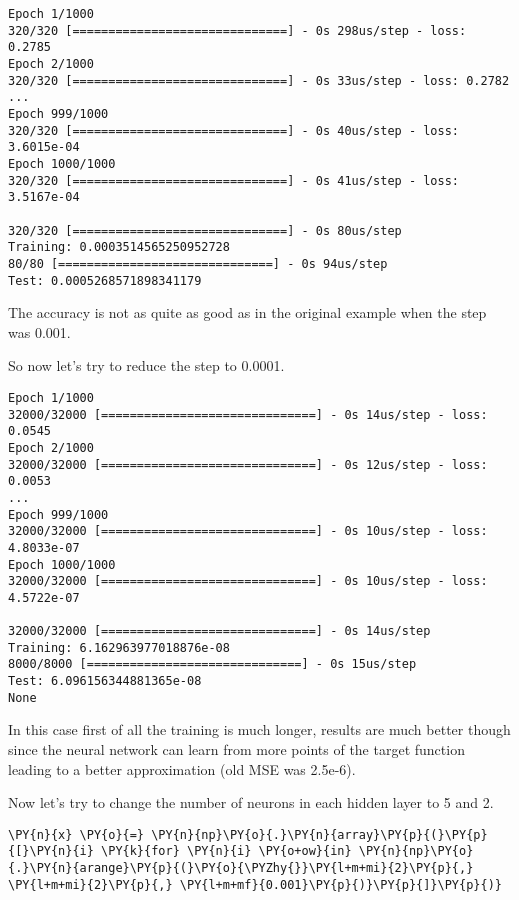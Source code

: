 \begin{Answer}
\begin{tcolorbox}[size=fbox, boxrule=1pt, colback=cellbackground, colframe=cellborder]
\begin{Verbatim}[commandchars=\\\{\}]
Epoch 1/1000
320/320 [==============================] - 0s 298us/step - loss: 0.2785
Epoch 2/1000
320/320 [==============================] - 0s 33us/step - loss: 0.2782
...
Epoch 999/1000
320/320 [==============================] - 0s 40us/step - loss: 3.6015e-04
Epoch 1000/1000
320/320 [==============================] - 0s 41us/step - loss: 3.5167e-04

320/320 [==============================] - 0s 80us/step
Training: 0.0003514565250952728
80/80 [==============================] - 0s 94us/step
Test: 0.0005268571898341179
\end{Verbatim}
\end{tcolorbox}

The accuracy is not as quite as good as in the original example when the step
was 0.001.

So now let's try to reduce the step to 0.0001.
\begin{tcolorbox}[size=fbox, boxrule=1pt, colback=cellbackground, colframe=cellborder]
\begin{Verbatim}[commandchars=\\\{\}]
Epoch 1/1000
32000/32000 [==============================] - 0s 14us/step - loss: 0.0545
Epoch 2/1000
32000/32000 [==============================] - 0s 12us/step - loss: 0.0053
...
Epoch 999/1000
32000/32000 [==============================] - 0s 10us/step - loss: 4.8033e-07
Epoch 1000/1000
32000/32000 [==============================] - 0s 10us/step - loss: 4.5722e-07

32000/32000 [==============================] - 0s 14us/step
Training: 6.162963977018876e-08
8000/8000 [==============================] - 0s 15us/step
Test: 6.096156344881365e-08
None
\end{Verbatim}
\end{tcolorbox}

In this case first of all the training is much longer, results are much
better though since the neural network can learn from more points of the
target function leading to a better approximation (old MSE was 2.5e-6).

Now let's try to change the number of neurons in each hidden layer to 5 and 2.
\begin{tcolorbox}[size=fbox, boxrule=1pt,colback=cellbackground, colframe=cellborder]
\begin{Verbatim}[commandchars=\\\{\}]
\PY{n}{x} \PY{o}{=} \PY{n}{np}\PY{o}{.}\PY{n}{array}\PY{p}{(}\PY{p}{[}\PY{n}{i} \PY{k}{for} \PY{n}{i} \PY{o+ow}{in} \PY{n}{np}\PY{o}{.}\PY{n}{arange}\PY{p}{(}\PY{o}{\PYZhy{}}\PY{l+m+mi}{2}\PY{p}{,} \PY{l+m+mi}{2}\PY{p}{,} \PY{l+m+mf}{0.001}\PY{p}{)}\PY{p}{]}\PY{p}{)}
	

\end{Verbatim}
\end{tcolorbox}
\end{Answer}
